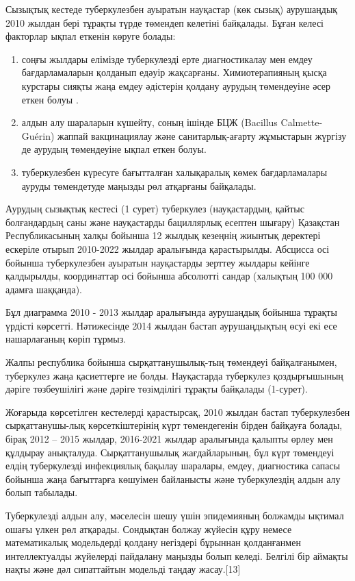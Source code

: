 \begin{multicols}{2}

Сызықтық кестеде туберкулезбен ауыратын науқастар (көк сызық) аурушаңдық
2010 жылдан бері тұрақты түрде төмендеп келетіні байқалады. Бұған келесі
факторлар ықпал еткенін көруге болады:

\begin{enumerate}
\def\labelenumi{\arabic{enumi})}\setlength{\itemindent}{1cm}

\item
  соңғы жылдары елімізде туберкулезді ерте диагностикалау мен емдеу
  бағдарламаларын қолданып едәуір жақсарғаны. Химиотерапияның қысқа
  курстары сияқты жаңа емдеу әдістерін қолдану аурудың төмендеуіне әсер
  еткен болуы .
\item
  алдын алу шараларын күшейту, соның ішінде БЦЖ (Bacillus
  Calmette-Guérin) жаппай вакцинациялау және санитарлық-ағарту
  жұмыстарын жүргізу де аурудың төмендеуіне ықпал еткен болуы.
\item
  туберкулезбен күресуге бағытталған халықаралық көмек бағдарламалары
  ауруды төмендетуде маңызды рөл атқарғаны байқалады.
\end{enumerate}

Аурудың сызықтық кестесі (1 сурет) туберкулез (науқастардың, қайтыс
болғандардың саны және науқастарды бациллярлық есептен шығару) Қазақстан
Республикасының халқы бойынша 12 жылдық кезеңнің жиынтық деректері
ескеріле отырып 2010-2022 жылдар аралығында қарастырылды. Абсцисса осі
бойынша туберкулезбен ауыратын науқастарды зерттеу жылдары кейінге
қалдырылды, координаттар осі бойынша абсолютті сандар (халықтың 100 000
адамға шаққанда).

Бұл диаграмма 2010 - 2013 жылдар аралығында аурушаңдық бойынша тұрақты
үрдісті көрсетті. Нәтижесінде 2014 жылдан бастап аурушаңдықтың өсуі екі
есе нашарлағаның көріп тұрмыз.

Жалпы республика бойынша сырқаттанушылық-тың төмендеуі байқалғанымен,
туберкулез жаңа қасиеттерге ие болды. Науқастарда туберкулез
қоздырғышының дәріге төзбеушілігі және дәріге төзімділігі тұрақты
байқалады (1-сурет).

Жоғарыда көрсетілген кестелерді қарастырсақ, 2010 жылдан бастап
туберкулезбен сырқаттанушы-лық көрсеткіштерінің күрт төмендегенін бірден
байқауға болады, бірақ 2012 -- 2015 жылдар, 2016-2021 жылдар аралығында
қалыпты өрлеу мен құлдырау анықталуда. Сырқаттанушылық жағдайларының,
бұл күрт төмендеуі елдің туберкулезді инфекциялық бақылау шаралары,
емдеу, диагностика сапасы бойынша жаңа бағыттарға көшуімен байланысты
және туберкулездің алдын алу болып табылады.

Туберкулезді алдын алу, мәселесін шешу үшін эпидемияның болжамды ықтимал
ошағы үлкен рөл атқарады. Сондықтан болжау жүйесін құру немесе
математикалық модельдерді қолдану негіздері бұрыннан қолданғанмен
интеллектуалды жүйелерді пайдалану маңызды болып келеді. Белгілі бір
аймақты нақты және дәл сипаттайтын модельді таңдау жасау.{[}13{]}
\end{multicols}


